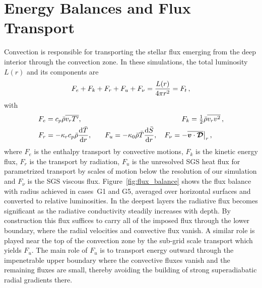 \section{Energy Balances and Flux Transport}
\label{sec:energies}

Convection is responsible for transporting the stellar flux emerging
from the deep interior through the convection zone.  In these
simulations, the total luminosity $L(r)$ and its components are
\begin{equation}
  F_e + F_k + F_r + F_u + F_\nu = \frac{L(r)}{4 \pi r^2} = F_t\thinspace,
\end{equation}
with
\begin{eqnarray}
  & F_e = c_p \bar{\rho} \overline{v_r T'}, 
  & F_k = \tfrac{1}{2} \bar{\rho} \overline{v_r v^2}\thinspace,\\
  & F_r = -\kappa_r c_p \bar{\rho} \frac{\mathrm{d} \bar{T}}{\mathrm{d} r}, \quad
  & F_u = -\kappa_0 \bar{\rho} \bar{T} \frac{\mathrm{d}\bar{S}}{\mathrm{d}r}, \quad
    F_\nu = -\overline{\boldsymbol{v} \cdot \boldsymbol{\mathcal{D}}} {\big|}_r\thinspace, \quad ~~
\end{eqnarray}
where $F_e$ is the enthalpy transport by convective motions, $F_k$ is
the kinetic energy flux, $F_r$ is the transport by radiation, $F_u$ is
the unresolved SGS heat flux for parametrized transport by scales of motion below the
resolution of our simulation and $F_\nu$ is the SGS viscous flux.
Figure~\ref{fig:flux_balance} shows the 
flux balance with radius achieved in cases~G1 and
G5, averaged over horizontal surfaces and converted to relative luminosities.   
%
In the deepest layers the radiative flux becomes significant as the
radiative conductivity steadily increases with depth.  By construction
this flux suffices to carry all of the imposed flux through the lower
boundary, where the radial velocities and convective flux vanish.
A similar role is played near the top of the convection zone by the
sub-grid scale transport which yields $F_u$.
The main role of $F_u$ is to transport energy outward through
the impenetrable upper boundary where the convective fluxes vanish and
the remaining fluxes are small, thereby avoiding the 
building of strong superadiabatic radial gradients there. 

